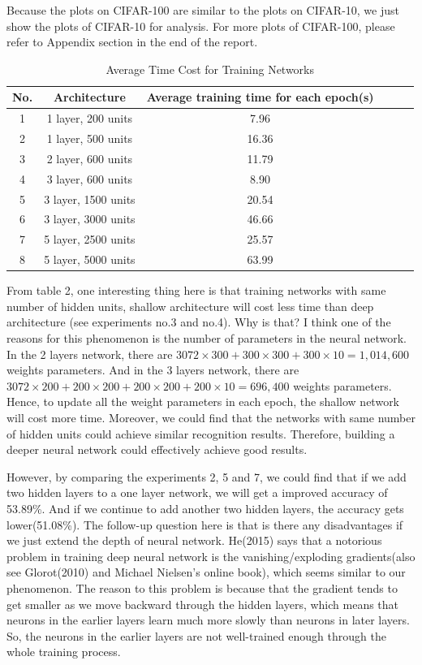 \documentclass[]{article}
\begin{document}
Because the plots on CIFAR-100 are similar to the plots on CIFAR-10, we just show the plots of CIFAR-10 for analysis. For more plots of CIFAR-100, please refer to Appendix section in the end of the report.

\begin{table}[ht]
\centering 
\caption{Average Time Cost for Training Networks}
\begin{tabular}{c c c c c c}
\toprule
No. & Architecture & Average training time for each epoch(s) \\
\midrule
1 & 1 layer, 200 units &  7.96  \\
2 & 1 layer, 500 units &  16.36 \\
3 & 2 layer, 600 units &  11.79 \\
4 & 3 layer, 600 units &  8.90  \\
5 & 3 layer, 1500 units & 20.54 \\
6 & 3 layer, 3000 units & 46.66 \\
7 & 5 layer, 2500 units & 25.57 \\
8 & 5 layer, 5000 units & 63.99 \\
\bottomrule
\end{tabular}
\end{table}

From table 2, one interesting thing here is that training networks with same number of hidden units, shallow architecture will cost less time than deep architecture (see experiments no.3 and no.4). Why is that? I think one of the reasons for this phenomenon is the number of parameters in the neural network. In the 2 layers network, there are $3072 \times 300 + 300 \times 300 + 300 \times 10 = 1,014,600$ weights parameters. And in the 3 layers network, there are $3072 \times 200 + 200 \times 200 + 200 \times 200 + 200 \times 10 = 696,400$ weights parameters. Hence, to update all the weight parameters in each epoch, the shallow network will cost more time. Moreover, we could find that the networks with same number of hidden units could achieve similar recognition results. Therefore, building a deeper neural network could effectively achieve good results.

However, by comparing the experiments 2, 5 and 7, we could find that if we add two hidden layers to a one layer network, we will get a improved accuracy of 53.89\%. And if we continue to add another two hidden layers, the accuracy gets lower(51.08\%). The follow-up question here is that is there any disadvantages if we just extend the depth of neural network. He(2015) says that a notorious problem in training deep neural network is the vanishing/exploding gradients(also see Glorot(2010) and Michael Nielsen's online book), which seems similar to our phenomenon. The reason to this problem is because that the gradient tends to get smaller as we move backward through the hidden layers, which means that neurons in the earlier layers learn much more slowly than neurons in later layers. So, the neurons in the earlier layers are not well-trained enough through the whole training process.
\end{document}
